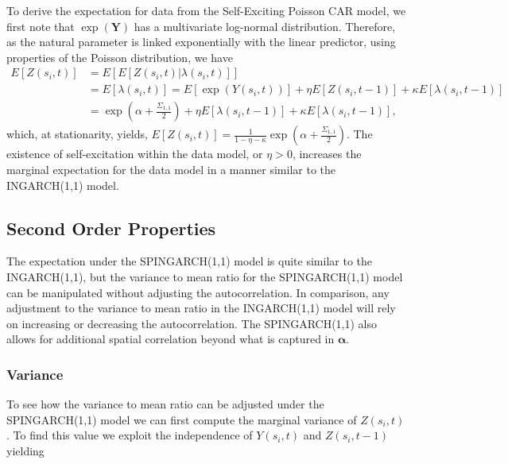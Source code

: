 \documentclass[11pt]{isuthesis}
\begin{document}
To derive the expectation for data from the Self-Exciting Poisson CAR model, we first note that $\exp(\boldsymbol{Y})$ has a multivariate log-normal distribution.  Therefore, as the natural parameter is linked exponentially with the linear predictor, using properties of the Poisson distribution, we have 
\begin{align}
	E\left[Z(s_i,t)\right] & = E\left[E\left[Z(s_i,t)|\lambda(s_i,t)\right]\right] \nonumber\\
	&= E\left[\lambda(s_i,t)\right]= E\left[\exp(Y(s_i,t))\right]+\eta E\left[Z(s_i,t-1)\right] +\kappa E\left[\lambda(s_i,t-1)\right] \nonumber\\
	& = \exp\left(\alpha+\frac{\Sigma_{1,1}}{2}\right)+\eta E\left[\lambda(s_i,t-1)\right] +\kappa E\left[\lambda(s_i,t-1)\right] \label{eq:Expectation},
\end{align}
which, at stationarity, yields, $E\left[Z(s_i,t)\right]=\frac{1}{1-\eta-\kappa}\exp(\alpha+\frac{\Sigma_{1,1}}{2})$.  The existence of self-excitation within the data model, or $\eta>0$, increases the marginal expectation for the data model in a manner similar to the INGARCH(1,1) model.  



\subsection{Second Order Properties}
The expectation under the SPINGARCH(1,1) model is quite similar to the INGARCH(1,1), but the variance to mean ratio for the SPINGARCH(1,1) model can be manipulated without adjusting the autocorrelation.  In comparison, any adjustment to the variance to mean ratio in the INGARCH(1,1) model will rely on increasing or decreasing the autocorrelation.  The SPINGARCH(1,1) also allows for additional spatial correlation beyond what is captured in $\boldsymbol{\alpha}$.
\subsubsection{Variance}

To see how the variance to mean ratio can be adjusted under the SPINGARCH(1,1) model we can first compute the marginal variance of $Z(s_i,t)$. To find this value we exploit the independence of $Y(s_i,t)$ and $Z(s_i,t-1)$ yielding
\end{document}
